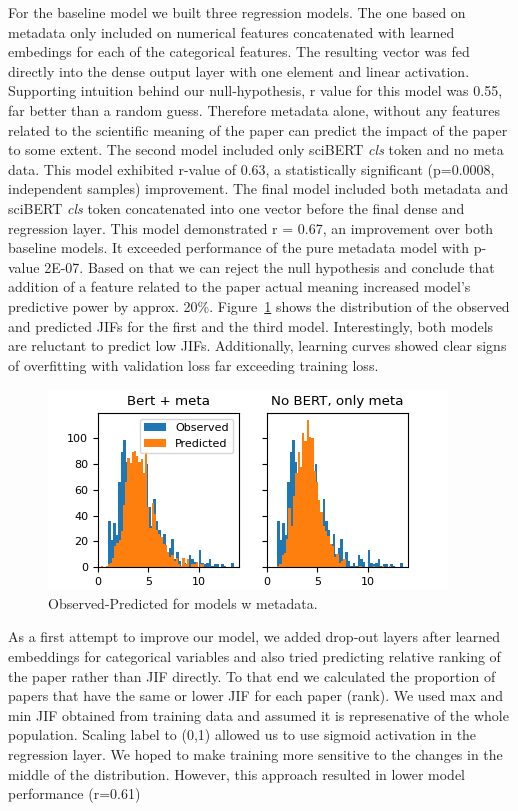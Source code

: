 \documentclass[11pt]{article}
\begin{document}
For the baseline model we built three regression models. The one based on metadata only included on numerical features concatenated with learned embedings for each of the categorical features. The resulting vector was fed directly into the dense output layer with one element and linear activation.  Supporting intuition behind our null-hypothesis, r value for this model was 0.55, far better than a random guess. Therefore metadata alone, without any features related to the scientific meaning of the paper can predict the impact of the paper to some extent. The second model included only sciBERT \textit{cls} token and no meta data. This model exhibited r-value of 0.63, a statistically significant (p=0.0008, independent samples) improvement. The final model included both metadata and sciBERT \textit{cls} token concatenated into one vector before the final dense and regression layer. This model demonstrated r = 0.67, an improvement over both baseline models. It exceeded performance of the pure metadata model with p-value 2E-07. Based on that we can reject the null hypothesis and conclude that addition of a feature related to the paper actual meaning increased model's predictive power by approx. 20\%.
Figure~\ref{fig:meta_no_meta} shows the distribution of the observed and predicted JIFs for the first and the third model. Interestingly, both models are reluctant to predict low JIFs. Additionally, learning curves showed clear signs of overfitting with validation loss far exceeding training loss. 
\begin{figure}
	\includegraphics[width= \columnwidth]{./Images/meta no meta.png}
	\caption{Observed-Predicted for models w metadata.}
	\label{fig:meta_no_meta}
\end{figure}

As a first attempt to improve our model, we added drop-out layers after learned embeddings for categorical variables and also tried predicting relative ranking of the paper rather than JIF directly. To that end we calculated the proportion of papers that have the same or lower JIF for each paper (rank). We used max and min JIF obtained from training data and assumed it is represenative of the whole population. Scaling label to (0,1) allowed us to use sigmoid activation in the regression layer. We hoped to make training more sensitive to the changes in the middle of the distribution. However, this approach resulted in lower model performance (r=0.61) 
\end{document}
